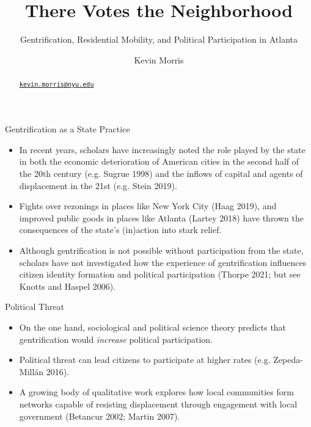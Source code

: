 \documentclass[
  ignorenonframetext,
  aspectratio=169]{beamer}
\title{There Votes the Neighborhood}
\subtitle{Gentrification, Residential Mobility, and Political
Participation in Atlanta}
\author{Kevin Morris}
\date{}
\institute{CUNY Graduate Center, Sociology}
\providecommand{\tightlist}{%
  \setlength{\itemsep}{0pt}\setlength{\parskip}{0pt}}
\begin{document}
\frame{\titlepage}
\begin{abstract}
\href{mailto:kevin.morris@nyu.edu}{\nolinkurl{kevin.morris@nyu.edu}}
\end{abstract}

\begin{frame}{Gentrification as a State Practice}
\protect\hypertarget{gentrification-as-a-state-practice}{}
\begin{itemize}[<+->]
\tightlist
\item
  In recent years, scholars have increasingly noted the role played by
  the state in both the economic deterioration of American cities in the
  second half of the 20th century (e.g. Sugrue 1998) and the inflows of
  capital and agents of displacement in the 21st (e.g. Stein 2019).
\end{itemize}

\begin{itemize}[<+->]
\tightlist
\item
  Fights over rezonings in places like New York City (Haag 2019), and
  improved public goods in places like Atlanta (Lartey 2018) have thrown
  the consequences of the state's (in)action into stark relief.
\end{itemize}

\begin{itemize}[<+->]
\tightlist
\item
  Although gentrification is not possible without participation from the
  state, scholars have not investigated how the experience of
  gentrification influences citizen identity formation and political
  participation (Thorpe 2021; but see Knotts and Haspel 2006).
\end{itemize}
\end{frame}

\begin{frame}{Political Threat}
\protect\hypertarget{political-threat}{}
\begin{itemize}[<+->]
\tightlist
\item
  On the one hand, sociological and political science theory predicts
  that gentrification would \emph{increase} political participation.
\end{itemize}

\begin{itemize}[<+->]
\tightlist
\item
  Political threat can lead citizens to participate at higher rates
  (e.g. Zepeda-Millán 2016).
\end{itemize}

\begin{itemize}[<+->]
\tightlist
\item
  A growing body of qualitative work explores how local communities form
  networks capable of resisting displacement through engagement with
  local government (Betancur 2002; Martin 2007).
\end{itemize}
\end{frame}
\end{document}

